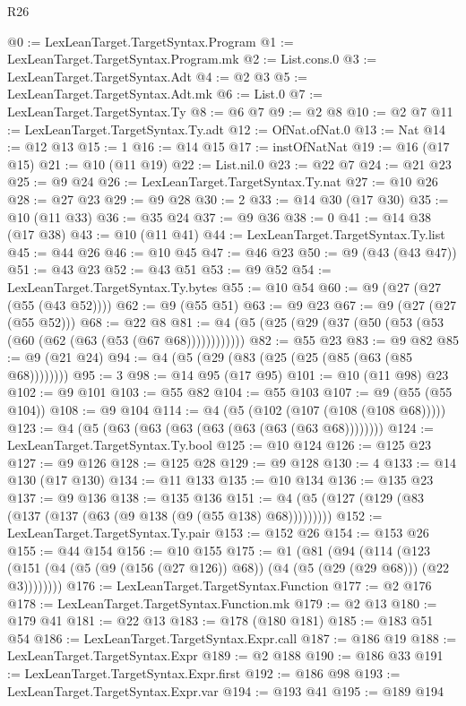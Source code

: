 \begin{lexlean}{R26}
\begin{coremodule}
@0 := LexLeanTarget.TargetSyntax.Program
@1 := LexLeanTarget.TargetSyntax.Program.mk
@2 := List.cons.{0}
@3 := LexLeanTarget.TargetSyntax.Adt
@4 := @2 @3
@5 := LexLeanTarget.TargetSyntax.Adt.mk
@6 := List.{0}
@7 := LexLeanTarget.TargetSyntax.Ty
@8 := @6 @7
@9 := @2 @8
@10 := @2 @7
@11 := LexLeanTarget.TargetSyntax.Ty.adt
@12 := OfNat.ofNat.{0}
@13 := Nat
@14 := @12 @13
@15 := 1
@16 := @14 @15
@17 := instOfNatNat
@19 := @16 (@17 @15)
@21 := @10 (@11 @19)
@22 := List.nil.{0}
@23 := @22 @7
@24 := @21 @23
@25 := @9 @24
@26 := LexLeanTarget.TargetSyntax.Ty.nat
@27 := @10 @26
@28 := @27 @23
@29 := @9 @28
@30 := 2
@33 := @14 @30 (@17 @30)
@35 := @10 (@11 @33)
@36 := @35 @24
@37 := @9 @36
@38 := 0
@41 := @14 @38 (@17 @38)
@43 := @10 (@11 @41)
@44 := LexLeanTarget.TargetSyntax.Ty.list
@45 := @44 @26
@46 := @10 @45
@47 := @46 @23
@50 := @9 (@43 (@43 @47))
@51 := @43 @23
@52 := @43 @51
@53 := @9 @52
@54 := LexLeanTarget.TargetSyntax.Ty.bytes
@55 := @10 @54
@60 := @9 (@27 (@27 (@55 (@43 @52))))
@62 := @9 (@55 @51)
@63 := @9 @23
@67 := @9 (@27 (@27 (@55 @52)))
@68 := @22 @8
@81 := @4 (@5 (@25 (@29 (@37 (@50 (@53 (@53 (@60 (@62 (@63 (@53 (@67 @68))))))))))))
@82 := @55 @23
@83 := @9 @82
@85 := @9 (@21 @24)
@94 := @4 (@5 (@29 (@83 (@25 (@25 (@85 (@63 (@85 @68))))))))
@95 := 3
@98 := @14 @95 (@17 @95)
@101 := @10 (@11 @98) @23
@102 := @9 @101
@103 := @55 @82
@104 := @55 @103
@107 := @9 (@55 (@55 @104))
@108 := @9 @104
@114 := @4 (@5 (@102 (@107 (@108 (@108 @68)))))
@123 := @4 (@5 (@63 (@63 (@63 (@63 (@63 (@63 (@63 @68))))))))
@124 := LexLeanTarget.TargetSyntax.Ty.bool
@125 := @10 @124
@126 := @125 @23
@127 := @9 @126
@128 := @125 @28
@129 := @9 @128
@130 := 4
@133 := @14 @130 (@17 @130)
@134 := @11 @133
@135 := @10 @134
@136 := @135 @23
@137 := @9 @136
@138 := @135 @136
@151 := @4 (@5 (@127 (@129 (@83 (@137 (@137 (@63 (@9 @138 (@9 (@55 @138) @68)))))))))
@152 := LexLeanTarget.TargetSyntax.Ty.pair
@153 := @152 @26
@154 := @153 @26
@155 := @44 @154
@156 := @10 @155
@175 := @1
    (@81
      (@94
        (@114
          (@123 (@151 (@4 (@5 (@9 (@156 (@27 @126)) @68)) (@4 (@5 (@29 (@29 @68))) (@22 @3))))))))
@176 := LexLeanTarget.TargetSyntax.Function
@177 := @2 @176
@178 := LexLeanTarget.TargetSyntax.Function.mk
@179 := @2 @13
@180 := @179 @41
@181 := @22 @13
@183 := @178 (@180 @181)
@185 := @183 @51 @54
@186 := LexLeanTarget.TargetSyntax.Expr.call
@187 := @186 @19
@188 := LexLeanTarget.TargetSyntax.Expr
@189 := @2 @188
@190 := @186 @33
@191 := LexLeanTarget.TargetSyntax.Expr.first
@192 := @186 @98
@193 := LexLeanTarget.TargetSyntax.Expr.var
@194 := @193 @41
@195 := @189 @194

\end{coremodule}
\end{lexlean}
